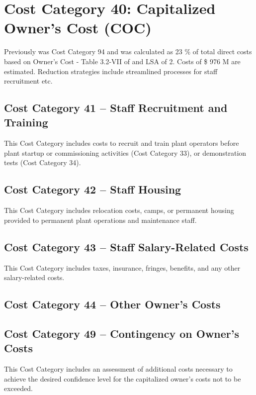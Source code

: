 \section{Cost Category 40: Capitalized Owner’s Cost (COC)}

Previously was Cost Category 94 and was calculated as 23 \% of total direct costs based on Owner's Cost - Table 3.2-VII of \cite{SCH78} and LSA of 2. Costs of \$ 976 M are estimated. Reduction strategies include streamlined processes for staff recruitment etc. 

\subsection*{Cost Category 41 – Staff Recruitment and Training}
This Cost Category includes costs to recruit and train plant operators before plant startup or commissioning activities (Cost Category 33), or demonstration tests (Cost Category 34).

\subsection*{Cost Category 42 – Staff Housing}
This Cost Category includes relocation costs, camps, or permanent housing provided to permanent plant operations and maintenance staff.

\subsection*{Cost Category 43 – Staff Salary-Related Costs}
This Cost Category includes taxes, insurance, fringes, benefits, and any other salary-related costs.

\subsection*{Cost Category 44 – Other Owner’s Costs}

\subsection*{Cost Category 49 – Contingency on Owner’s Costs}
This Cost Category includes an assessment of additional costs necessary to achieve the desired confidence level for the capitalized owner’s costs not to be exceeded.
